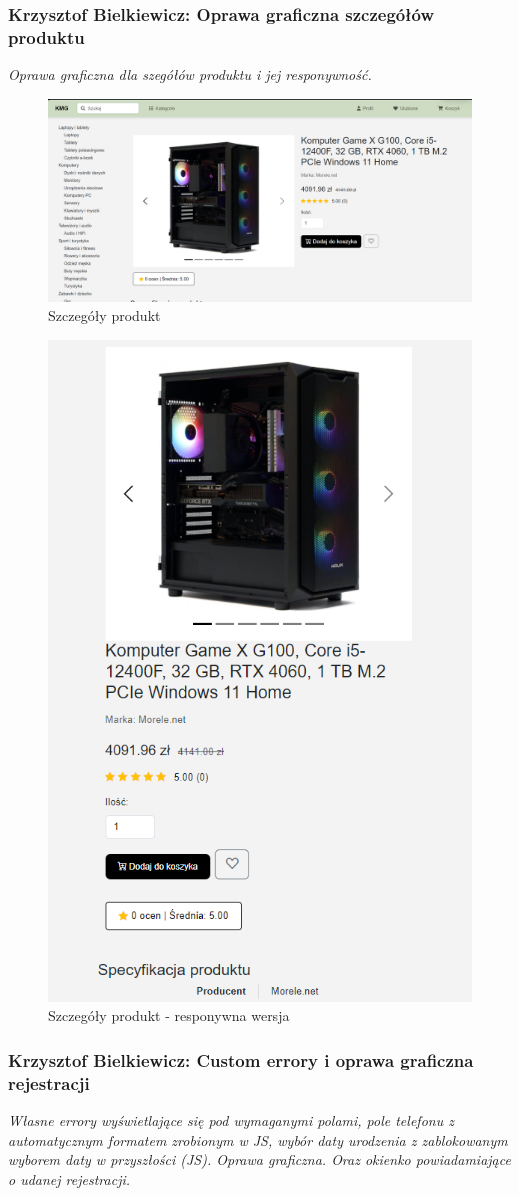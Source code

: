 \documentclass[12pt,a4paper,oneside]{article}
\theoremstyle{definition}
\numberwithin{equation}{section}
\begin{document}
\subsubsection{Krzysztof Bielkiewicz: Oprawa graficzna szczegółów produktu}
\label{1.3.16}
\textit{Oprawa graficzna dla szegółów produktu i jej responywność.}
\begin{figure}[H]
    \centering
    \includegraphics[width=1.0\columnwidth]{images/krzysztofBImages/product-detail.png}
    \caption{Szczegóły produkt}
\end{figure}
\begin{figure}[H]
    \centering
    \includegraphics[width=0.5\columnwidth]{images/krzysztofBImages/product-detail-respo.png}
    \caption{Szczegóły produkt - responywna wersja}
\end{figure}

\subsubsection{Krzysztof Bielkiewicz: Custom errory i oprawa graficzna rejestracji}
\label{1.3.17}
\textit{Własne errory wyświetlające się pod wymaganymi polami,
pole telefonu z automatycznym formatem zrobionym w JS,
 wybór daty urodzenia z zablokowanym wyborem daty w przyszłości (JS). Oprawa graficzna.
 Oraz okienko powiadamiające o udanej rejestracji.}
\end{document}
